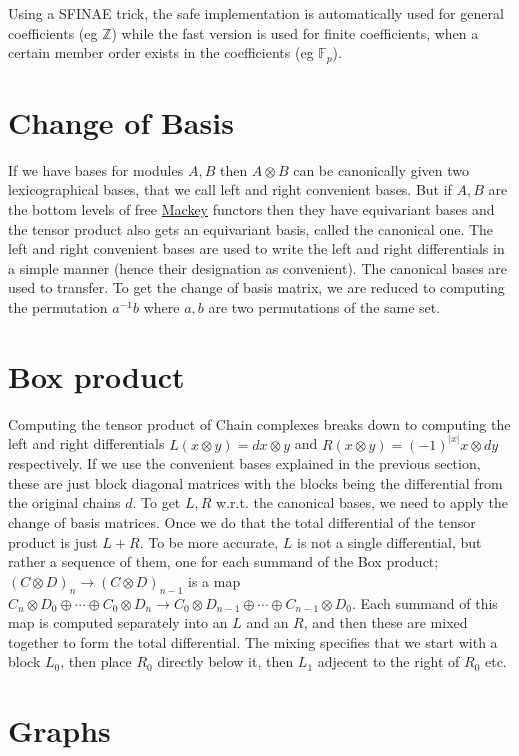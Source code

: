 Using a S\+F\+I\+N\+AE trick, the safe implementation is automatically used for general coefficients (eg $\mathbb Z$) while the fast version is used for finite coefficients, when a certain member {\ttfamily order} exists in the coefficients (eg $\mathbb F_p$).\hypertarget{algo_cob}{}\section{Change of Basis}\label{algo_cob}
If we have bases for modules $A,B$ then $A\otimes B$ can be canonically given two lexicographical bases, that we call left and right convenient bases. But if $A,B$ are the bottom levels of free \hyperlink{namespaceMackey}{Mackey} functors then they have equivariant bases and the tensor product also gets an equivariant basis, called the canonical one. The left and right convenient bases are used to write the left and right differentials in a simple manner (hence their designation as convenient). The canonical bases are used to transfer. To get the change of basis matrix, we are reduced to computing the permutation $a^{-1}b$ where $a,b$ are two permutations of the same set.\hypertarget{algo_box}{}\section{Box product}\label{algo_box}
Computing the tensor product of Chain complexes breaks down to computing the left and right differentials $L(x\otimes y)=dx\otimes y$ and $R(x\otimes y)=(-1)^{|x|}x\otimes dy$ respectively. If we use the convenient bases explained in the previous section, these are just block diagonal matrices with the blocks being the differential from the original chains $d$. To get $L,R$ w.\+r.\+t. the canonical bases, we need to apply the change of basis matrices. Once we do that the total differential of the tensor product is just $L+R$. To be more accurate, $L$ is not a single differential, but rather a sequence of them, one for each summand of the Box product; $(C\otimes D)_n\to (C\otimes D)_{n-1}$ is a map $C_n\otimes D_0\oplus\cdots \oplus C_0\otimes D_n\to C_0\otimes D_{n-1}\oplus\cdots\oplus C_{n-1}\otimes D_0$. Each summand of this map is computed separately into an $L$ and an $R$, and then these are mixed together to form the total differential. The mixing specifies that we start with a block $ L_0$, then place $ R_0$ directly below it, then $L_1$ adjecent to the right of $ R_0$ etc.\hypertarget{algo_graph}{}\section{Graphs}\label{algo_graph}

